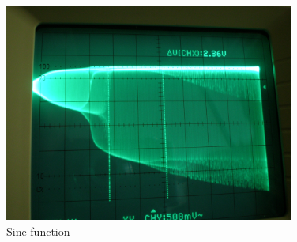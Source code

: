 \begin{figure}[H]
\centering \includegraphics[width= 0.85\textwidth]{Fotos2/19.jpg}
\caption{Sine-function}
\end{figure}






















